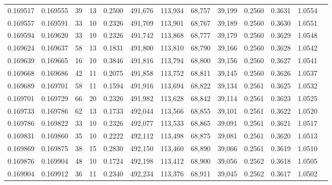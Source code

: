 \begin{tabular}{rrrrrrrrrrrrr}
0.169517 & 0.169555 &    39 &  13 &                                     0.2500 & 491,676 & 113,934 &  68,757 &  39,199 & 0.2560 & 0.3631 & 1.0554 \\
0.169557 & 0.169591 &    33 &  10 &                                     0.2326 & 491,709 & 113,901 &  68,767 &  39,189 & 0.2560 & 0.3630 & 1.0551 \\
0.169594 & 0.169620 &    33 &  10 &                                     0.2326 & 491,742 & 113,868 &  68,777 &  39,179 & 0.2560 & 0.3629 & 1.0548 \\
0.169624 & 0.169637 &    58 &  13 &                                     0.1831 & 491,800 & 113,810 &  68,790 &  39,166 & 0.2560 & 0.3628 & 1.0542 \\
0.169639 & 0.169665 &    16 &  10 &                                     0.3846 & 491,816 & 113,794 &  68,800 &  39,156 & 0.2560 & 0.3627 & 1.0541 \\
0.169668 & 0.169686 &    42 &  11 &                                     0.2075 & 491,858 & 113,752 &  68,811 &  39,145 & 0.2560 & 0.3626 & 1.0537 \\
0.169689 & 0.169701 &    58 &  11 &                                     0.1594 & 491,916 & 113,694 &  68,822 &  39,134 & 0.2561 & 0.3625 & 1.0532 \\
0.169701 & 0.169729 &    66 &  20 &                                     0.2326 & 491,982 & 113,628 &  68,842 &  39,114 & 0.2561 & 0.3623 & 1.0525 \\
0.169733 & 0.169786 &    62 &  13 &                                     0.1733 & 492,044 & 113,566 &  68,855 &  39,101 & 0.2561 & 0.3622 & 1.0520 \\
0.169786 & 0.169822 &    33 &  10 &                                     0.2326 & 492,077 & 113,533 &  68,865 &  39,091 & 0.2561 & 0.3621 & 1.0517 \\
0.169831 & 0.169860 &    35 &  10 &                                     0.2222 & 492,112 & 113,498 &  68,875 &  39,081 & 0.2561 & 0.3620 & 1.0513 \\
0.169869 & 0.169875 &    38 &  15 &                                     0.2830 & 492,150 & 113,460 &  68,890 &  39,066 & 0.2561 & 0.3619 & 1.0510 \\
0.169876 & 0.169904 &    48 &  10 &                                     0.1724 & 492,198 & 113,412 &  68,900 &  39,056 & 0.2562 & 0.3618 & 1.0505 \\
0.169904 & 0.169912 &    36 &  11 &                                     0.2340 & 492,234 & 113,376 &  68,911 &  39,045 & 0.2562 & 0.3617 & 1.0502 \\

\end{tabular}
